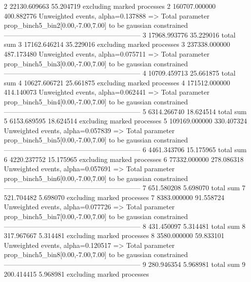 2          22130.609663    55.204719       excluding marked processes    
2          160707.000000   400.882776      Unweighted events, alpha=0.137888
  => Total parameter prop_binch5_bin2[0.00,-7.00,7.00] to be gaussian constrained
------------------------------------------------------------
3          17968.993776    35.229016       total sum                     
3          17162.646214    35.229016       excluding marked processes    
3          237338.000000   487.173480      Unweighted events, alpha=0.075711
  => Total parameter prop_binch5_bin3[0.00,-7.00,7.00] to be gaussian constrained
------------------------------------------------------------
4          10709.459713    25.661875       total sum                     
4          10627.606721    25.661875       excluding marked processes    
4          171512.000000   414.140073      Unweighted events, alpha=0.062441
  => Total parameter prop_binch5_bin4[0.00,-7.00,7.00] to be gaussian constrained
------------------------------------------------------------
5          6314.266740     18.624514       total sum                     
5          6153.689595     18.624514       excluding marked processes    
5          109169.000000   330.407324      Unweighted events, alpha=0.057839
  => Total parameter prop_binch5_bin5[0.00,-7.00,7.00] to be gaussian constrained
------------------------------------------------------------
6          4461.343706     15.175965       total sum                     
6          4220.237752     15.175965       excluding marked processes    
6          77332.000000    278.086318      Unweighted events, alpha=0.057691
  => Total parameter prop_binch5_bin6[0.00,-7.00,7.00] to be gaussian constrained
------------------------------------------------------------
7          651.580208      5.698070        total sum                     
7          521.704482      5.698070        excluding marked processes    
7          8383.000000     91.558724       Unweighted events, alpha=0.077726
  => Total parameter prop_binch5_bin7[0.00,-7.00,7.00] to be gaussian constrained
------------------------------------------------------------
8          431.450097      5.314481        total sum                     
8          317.967667      5.314481        excluding marked processes    
8          3580.000000     59.833101       Unweighted events, alpha=0.120517
  => Total parameter prop_binch5_bin8[0.00,-7.00,7.00] to be gaussian constrained
------------------------------------------------------------
9          280.946354      5.968981        total sum                     
9          200.414415      5.968981        excluding marked processes    
